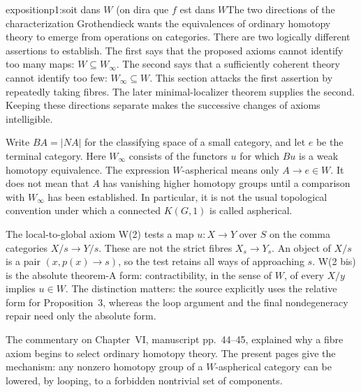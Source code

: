 \begin{dcomment}{exposition}{p1:soit dans $W$ (on dira que $f$ est dans $W$}{The two directions of the characterization}
Grothendieck wants the equivalences of ordinary homotopy theory to emerge from operations on categories. There are two logically different assertions to establish. The first says that the proposed axioms cannot identify too many maps: \(W\subseteq W_\infty\). The second says that a sufficiently coherent theory cannot identify too few: \(W_\infty\subseteq W\). This section attacks the first assertion by repeatedly taking fibres. The later minimal-localizer theorem supplies the second. Keeping these directions separate makes the successive changes of axioms intelligible.

Write \(BA=|NA|\) for the classifying space of a small category, and let \(e\) be the terminal category. Here \(W_\infty\) consists of the functors \(u\) for which \(Bu\) is a weak homotopy equivalence. The expression \(W\)-aspherical means only \(A\to e\in W\). It does not mean that \(A\) has vanishing higher homotopy groups until a comparison with \(W_\infty\) has been established. In particular, it is not the usual topological convention under which a connected \(K(G,1)\) is called aspherical.

The local-to-global axiom W(2) tests a map \(u:X\to Y\) over \(S\) on the comma categories \(X/s\to Y/s\). These are not the strict fibres \(X_s\to Y_s\). An object of \(X/s\) is a pair \((x,p(x)\to s)\), so the test retains all ways of approaching \(s\). W(2 bis) is the absolute theorem-A form: contractibility, in the sense of \(W\), of every \(X/y\) implies \(u\in W\). The distinction matters: the source explicitly uses the relative form for Proposition~3, whereas the loop argument and the final nondegeneracy repair need only the absolute form.

The commentary on Chapter~VI, manuscript pp.~44--45, explained why a fibre axiom begins to select ordinary homotopy theory. The present pages give the mechanism: any nonzero homotopy group of a \(W\)-aspherical category can be lowered, by looping, to a forbidden nontrivial set of components.
\end{dcomment}

